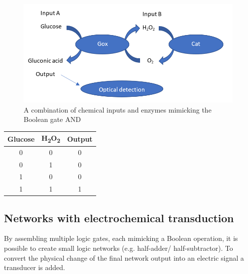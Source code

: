 \documentclass[runningheads]{llncs}
\begin{document}
		\begin{figure}[H] \centering \includegraphics[scale= 0.33]{pics/ANDneu.png} \caption{A combination of chemical inputs and enzymes mimicking the Boolean gate AND} \label{img:and} \end{figure}
		
		\begin{center}
		\begin{tabular}{c|c|c}
			Glucose & H\textsubscript{2}O\textsubscript{2} & Output\\\hline
			0 & 0 & 0\\ 
			0 & 1 & 0\\
			1 & 0 & 0\\
			1 & 1 & 1
		\end{tabular}
		\end{center}
	
\subsection{Networks with electrochemical transduction}

		By assembling multiple logic gates, each mimicking a Boolean operation, it is possible to create small logic networks (e.g. half-adder/ half-subtractor). To convert the physical change of the final network output into an electric signal a transducer is added.
	
\end{document}
